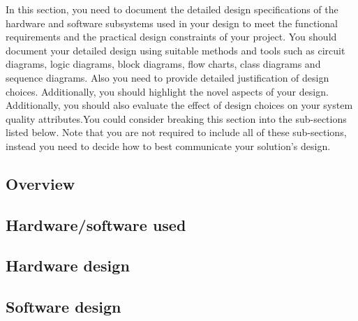 \documentclass[../main.tex]{subfiles}
\begin{document}
\lipsum[1]

\begin{newrequirements}
    In this section, you need to document the detailed 
    design specifications of the hardware and software 
    subsystems used in your design to meet the functional 
    requirements and the practical design constraints of 
    your project. You should document your detailed design 
    using suitable methods and tools such as circuit 
    diagrams, logic diagrams, block diagrams, flow charts, 
    class diagrams and sequence diagrams. Also you need to 
    provide detailed justification of design choices. 
    Additionally, you should highlight the novel aspects 
    of your design. Additionally, you should also evaluate 
    the effect of design choices on your system quality 
    attributes.You could consider breaking this section 
    into the sub-sections listed below.  Note that you are 
    not required to include all of these sub-sections, 
    instead you need to decide how to best communicate 
    your solution’s design.
\end{newrequirements}

\subsection{Overview}

\lipsum[2]

\subsection{Hardware/software used}

\lipsum[3]

\subsection{Hardware design}

\lipsum[4]

\subsection{Software design}

\lipsum[5]
\end{document}
